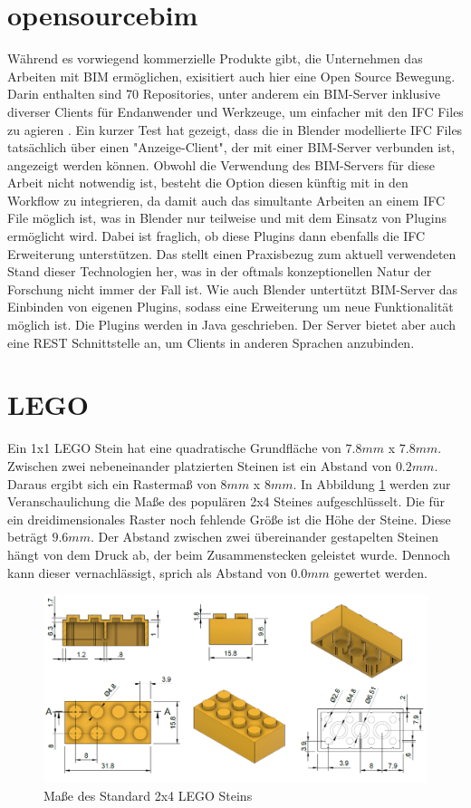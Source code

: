 \section{opensourcebim}
Während es vorwiegend kommerzielle Produkte gibt, die Unternehmen das Arbeiten mit BIM ermöglichen, exisitiert auch hier eine Open Source Bewegung.
Darin enthalten sind 70 Repositories, unter anderem ein BIM-Server inklusive diverser Clients für Endanwender und Werkzeuge, um einfacher mit den IFC Files zu agieren \cite{Theopens96:online}.
Ein kurzer Test hat gezeigt, dass die in Blender modellierte IFC Files tatsächlich über einen "Anzeige-Client", der mit einer BIM-Server verbunden ist, angezeigt werden können.
Obwohl die Verwendung des BIM-Servers für diese Arbeit nicht notwendig ist, besteht die Option diesen künftig mit in den Workflow zu integrieren, da damit auch das simultante Arbeiten an einem IFC File möglich ist, was in Blender nur teilweise und mit dem Einsatz von Plugins ermöglicht wird.
Dabei ist fraglich, ob diese Plugins dann ebenfalls die IFC Erweiterung unterstützen.
Das stellt einen Praxisbezug zum aktuell verwendeten Stand dieser Technologien her, was in der oftmals konzeptionellen Natur der Forschung nicht immer der Fall ist.
Wie auch Blender untertützt BIM-Server das Einbinden von eigenen Plugins, sodass eine Erweiterung um neue Funktionalität möglich ist.
Die Plugins werden in Java geschrieben.
Der Server bietet aber auch eine REST Schnittstelle an, um Clients in anderen Sprachen anzubinden.

\section{LEGO}
Ein 1x1 LEGO Stein hat eine  quadratische Grundfläche von \(7.8mm\) x \(7.8mm\).
Zwischen zwei nebeneinander platzierten Steinen ist ein Abstand von  \(0.2mm\).
Daraus ergibt sich ein Rastermaß von \(8mm\) x  \(8mm\).
In Abbildung \ref{fig:Lego 2x4 Brick} werden zur Veranschaulichung die Maße des populären 2x4 Steines aufgeschlüsselt.
Die für ein dreidimensionales Raster noch fehlende Größe ist die Höhe der Steine.
Diese beträgt \(9.6mm\).
Der Abstand zwischen zwei übereinander gestapelten Steinen hängt von dem Druck ab, der beim Zusammenstecken geleistet wurde.
Dennoch kann dieser vernachlässigt, sprich als Abstand von \(0.0mm\) gewertet werden.

\begin{figure}[ht]
    \centering
    \includegraphics[width=0.8\columnwidth]{fig/LEGO 2x4 Brick horizontal.png}
    \caption{Maße des Standard 2x4 LEGO Steins \cite{LEGOBric2:online}}
    \label{fig:Lego 2x4 Brick}
\end{figure}

